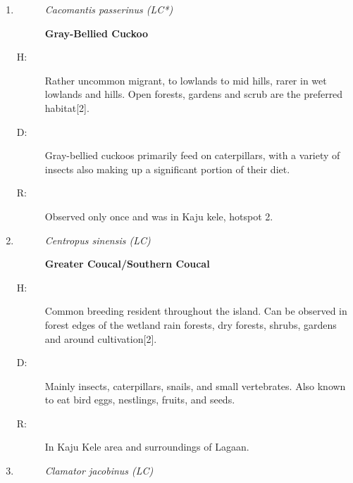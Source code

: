 \begin{itemize}
\begin{enumerate}
\begin{description}%
\item[H: ]%
Uncommon breeding resident with a rare migrant population. Has become more regular on lowlands in the recent past. Highly arboreal{[}2{]}.%
\item[D: ]%
Insectivores with special preference for catepillars.%
\item[R: ]%
Near L Canteen, Sumanadasa, and inside Kaju Kele.%
\end{description}%
\item%
\begin{description}%
\item[]%
\textit{Cacomantis passerinus (LC*)}%
\item[]%
\textbf{Gray{-}Bellied Cuckoo}%
\end{description}%
\begin{description}%
\item[H: ]%
Rather uncommon migrant, to lowlands to mid hills, rarer in wet lowlands and hills. Open forests, gardens and scrub are the preferred habitat{[}2{]}.%
\item[D: ]%
Gray{-}bellied cuckoos primarily feed on caterpillars, with a variety of insects also making up a significant portion of their diet.%
\item[R: ]%
Observed only once and was in Kaju kele, hotspot 2.%
\end{description}%
\item%
\begin{description}%
\item[]%
\textit{Centropus sinensis (LC)}%
\item[]%
\textbf{Greater Coucal/Southern Coucal}%
\end{description}%
\begin{description}%
\item[H: ]%
Common breeding resident throughout the island. Can be observed in forest edges of the wetland rain forests, dry forests, shrubs, gardens and around cultivation{[}2{]}.%
\item[D: ]%
Mainly insects, caterpillars, snails, and small vertebrates. Also known to eat bird eggs, nestlings, fruits, and seeds.%
\item[R: ]%
In Kaju Kele area and surroundings of Lagaan.%
\end{description}%
\item%
\begin{description}%
\item[]%
\textit{Clamator jacobinus (LC)}%

\end{description}
\end{enumerate}
\end{itemize}
